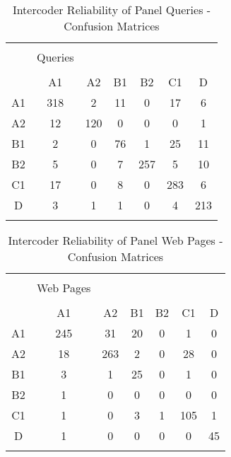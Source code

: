 \documentclass[12pt]{article}
\begin{document}
\begin{table}[!htbp] \centering
  \caption{Intercoder Reliability of Panel Queries - Confusion Matrices}
  \label{intercoder_queries}
\begin{tabular}{@{\extracolsep{5pt}} ccccccc}
\\[-1.8ex]\hline
\hline \\[-1.8ex]
 &   Queries & &&&& \\
\hline \\[-1.8ex]
      &   A1 & A2 & B1 & B2 & C1 &  D \\
  A1 &   318 &  2 & 11 &  0 & 17 &  6\\
  A2    & 12 &120 &  0  & 0   &0 &  1\\
  B1     & 2  & 0 & 76 &  1 & 25 & 11\\
  B2    & 5  & 0 &  7& 257  & 5 & 10\\
  C1     &17  & 0 &  8  & 0& 283 &  6\\
  D     & 3 &  1 &  1 &  0 &  4& 213\\
\hline \\[-1.8ex]
\end{tabular}
\end{table}

\clearpage

\begin{table}[!htbp] \centering
  \caption{Intercoder Reliability of Panel Web Pages - Confusion Matrices}
  \label{intercoder_webpages}
\begin{tabular}{@{\extracolsep{5pt}} ccccccc}
\\[-1.8ex]\hline
\hline \\[-1.8ex]
 &   Web Pages & &&&& \\
\hline \\[-1.8ex]
      & A1 & A2 & B1 &B2 & C1 & D \\
A1 &  245&31&20& 0& 1& 0 \\
A2 &  18 & 263& 2& 0&28& 0 \\
B1 &  3& 1&25& 0& 1& 0 \\
B2 &  1& 0& 0& 0& 0& 0 \\
C1 &  1& 0& 3& 1 & 105& 1 \\
D  & 1& 0& 0& 0& 0&45 \\
\hline \\[-1.8ex]
\end{tabular}
\end{table}
\end{document}
